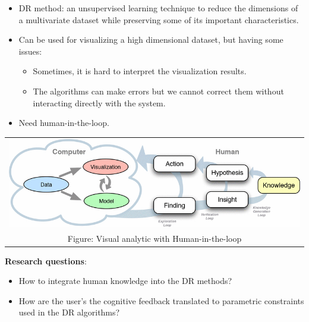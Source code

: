 \documentclass[portrait,final,a0paper]{nadiposter}
\newcommand{\compresslist}{%
\setlength{\itemsep}{1pt}%
\setlength{\parskip}{0pt}%
\setlength{\parsep}{0pt}%
\setlength{\leftmargin}{0pt}%
}
\begin{document}
\begin{poster}
{\begin{minipage}{0.45\linewidth}
\begin{itemize}
    \item DR method: an {\color{blue} unsupervised learning} technique to reduce the dimensions of a multivariate dataset while preserving some of its important characteristics.
    \item Can be used for {\color{blue}visualizing a high dimensional dataset}, but having some issues:
    \noindent
    \begin{itemize}
        \compresslist
        \item Sometimes, it is hard to interpret the visualization results.
        \item The algorithms can make errors but we cannot correct them without interacting directly with the system.
      \end{itemize}
    \item Need human-in-the-loop.
\end{itemize}
\end{minipage}
\begin{minipage}{0.48\linewidth}
\begin{center}
\begin{tabular}{c}
    \includegraphics[width=0.75\linewidth]{poster_idr01_UNamur_2017/figures/ml_with_human.png}\\
    \tiny{Figure: Visual analytic with Human-in-the-loop \cite{Sacha2017Interaction}}
\end{tabular}
\end{center}
\quad\quad\textbf{Research questions}:
\begin{itemize}
    \compresslist
    \item How to {\color{blue} integrate human knowledge} into the DR methods?
    \item How are the user's {\color{blue} the cognitive feedback} translated to {\color{blue} parametric constraints} used in the DR algorithms?
\end{itemize}
\end{minipage}
}

\end{poster}
\end{document}

